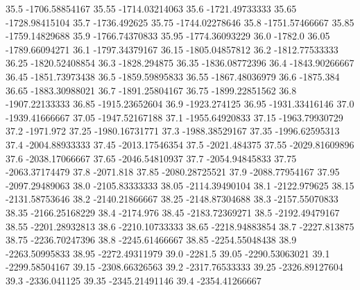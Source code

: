            35.5   -1706.58854167
          35.55   -1714.03214063
           35.6   -1721.49733333
          35.65   -1728.98415104
           35.7     -1736.492625
          35.75   -1744.02278646
           35.8   -1751.57466667
          35.85   -1759.14829688
           35.9   -1766.74370833
          35.95   -1774.36093229
           36.0          -1782.0
          36.05   -1789.66094271
           36.1   -1797.34379167
          36.15   -1805.04857812
           36.2   -1812.77533333
          36.25   -1820.52408854
           36.3     -1828.294875
          36.35   -1836.08772396
           36.4   -1843.90266667
          36.45   -1851.73973438
           36.5   -1859.59895833
          36.55   -1867.48036979
           36.6        -1875.384
          36.65   -1883.30988021
           36.7   -1891.25804167
          36.75   -1899.22851562
           36.8   -1907.22133333
          36.85   -1915.23652604
           36.9     -1923.274125
          36.95   -1931.33416146
           37.0   -1939.41666667
          37.05   -1947.52167188
           37.1   -1955.64920833
          37.15   -1963.79930729
           37.2        -1971.972
          37.25   -1980.16731771
           37.3   -1988.38529167
          37.35   -1996.62595313
           37.4   -2004.88933333
          37.45   -2013.17546354
           37.5     -2021.484375
          37.55   -2029.81609896
           37.6   -2038.17066667
          37.65   -2046.54810937
           37.7   -2054.94845833
          37.75   -2063.37174479
           37.8        -2071.818
          37.85   -2080.28725521
           37.9   -2088.77954167
          37.95   -2097.29489063
           38.0   -2105.83333333
          38.05   -2114.39490104
           38.1     -2122.979625
          38.15   -2131.58753646
           38.2   -2140.21866667
          38.25   -2148.87304688
           38.3   -2157.55070833
          38.35   -2166.25168229
           38.4        -2174.976
          38.45   -2183.72369271
           38.5   -2192.49479167
          38.55   -2201.28932813
           38.6   -2210.10733333
          38.65   -2218.94883854
           38.7     -2227.813875
          38.75   -2236.70247396
           38.8   -2245.61466667
          38.85   -2254.55048438
           38.9   -2263.50995833
          38.95   -2272.49311979
           39.0          -2281.5
          39.05   -2290.53063021
           39.1   -2299.58504167
          39.15   -2308.66326563
           39.2   -2317.76533333
          39.25   -2326.89127604
           39.3     -2336.041125
          39.35   -2345.21491146
           39.4   -2354.41266667
